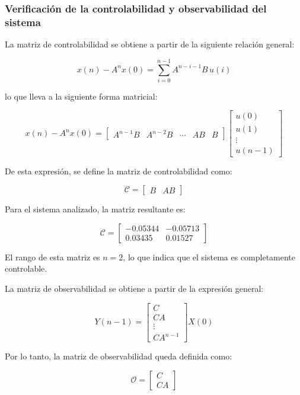 \subsubsection{Verificación de la controlabilidad y observabilidad del sistema}

La matriz de controlabilidad se obtiene a partir de la siguiente relación general:

\[
x(n) - A^{n}x(0) = \sum_{i=0}^{n-1} A^{n-i-1}B\,u(i)
\]

lo que lleva a la siguiente forma matricial:

\[
x(n) - A^{n}x(0) =
\begin{bmatrix}
	A^{n-1}B & A^{n-2}B & \cdots & AB & B
\end{bmatrix}
\begin{bmatrix}
	u(0) \\[2pt]
	u(1) \\[2pt]
	\vdots \\[2pt]
	u(n-1)
\end{bmatrix}
\]

De esta expresión, se define la matriz de controlabilidad como:

\[
\mathcal{C} =
\begin{bmatrix}
	B & AB
\end{bmatrix}
\]

Para el sistema analizado, la matriz resultante es:

\[
\mathcal{C} =
\begin{bmatrix}
	-0.05344 & -0.05713 \\[4pt]
	0.03435 & 0.01527
\end{bmatrix}
\]

El rango de esta matriz es $n = 2$, lo que indica que el sistema es completamente controlable.

\bigskip
La matriz de observabilidad se obtiene a partir de la expresión general:

\[
Y(n-1) = 
\begin{bmatrix}
	C \\[4pt]
	CA \\[4pt]
	\vdots \\[4pt]
	CA^{n-1}
\end{bmatrix}
X(0)
\]

Por lo tanto, la matriz de observabilidad queda definida como:

\[
\mathcal{O} =
\begin{bmatrix}
	C \\[4pt]
	CA
\end{bmatrix}
\]

